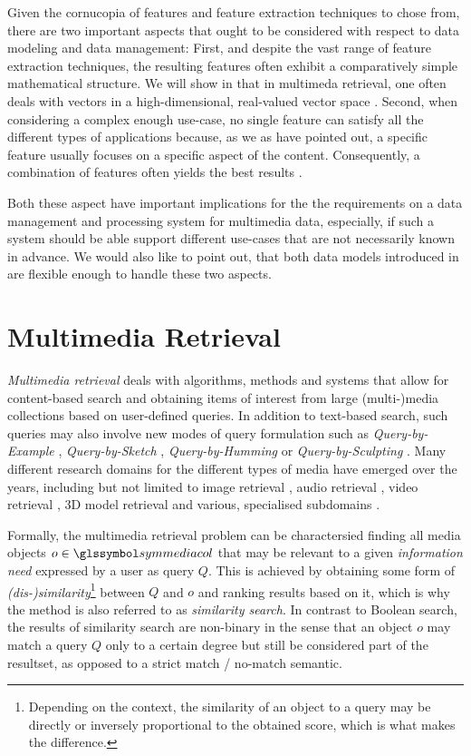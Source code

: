 Given the cornucopia of features and feature extraction techniques to chose from, there are two important aspects that ought to be considered with respect to data modeling and data management: First, and despite the vast range of feature extraction techniques, the resulting features often exhibit a comparatively simple mathematical structure. We will show in  that in multimeda retrieval, one often deals with vectors in a high-dimensional, real-valued vector space \cite{Zezula:2006Similarity}. Second, when considering a complex enough use-case, no single feature can satisfy all the different types of applications because, as we as have pointed out, a specific feature usually focuses on a specific aspect of the content. Consequently, a combination of features often yields the best results \cite{Deselaers:2008Features}.

Both these aspect have important implications for the the requirements on a data management and processing system for multimedia data, especially, if such a system should be able support different use-cases that are not necessarily known in advance. We would also like to point out, that both data models introduced in  are flexible enough to handle these two aspects.

\section{Multimedia Retrieval}
\label{section:multimedia_retrieval}

\emph{Multimedia retrieval} deals with algorithms, methods and systems that allow for content-based search and obtaining items of interest from large (multi-)media collections based on user-defined queries. In addition to text-based search, such queries may also involve new modes of query formulation such as \emph{Query-by-Example} \cite{Kelly:1995Query}, \emph{Query-by-Sketch} \cite{Cao:2010mind}, \emph{Query-by-Humming} \cite{Ghias:1995query} or \emph{Query-by-Sculpting} \cite{Boerlin:20203d}. Many different research domains for the different types of media have emerged over the years, including but not limited to image retrieval \cite{Dharani:2013Survey}, audio retrieval \cite{Lu:2001Indexing}, video retrieval \cite{Hu:2011Survey}, 3D model retrieval \cite{Yang:2007Content} and various, specialised subdomains \cite{Murthy:2018Content}.

Formally, the multimedia retrieval problem can be charactersied finding all media objects $o \in \symmediacol$ that may be relevant to a given \emph{information need} expressed by a user as query $Q$. This is achieved by obtaining some form of \emph{(dis-)similarity}\footnote{Depending on the context, the similarity of an object to a query may be directly or inversely proportional to the obtained score, which is what makes the difference.} between $Q$ and $o$ and ranking results based on it, which is why the method is also referred to as \emph{similarity search}. In contrast to Boolean search, the results of similarity search are non-binary in the sense that an object $o$ may match a query $Q$ only to a certain degree but still be considered part of the resultset, as opposed to a strict match / no-match semantic.

